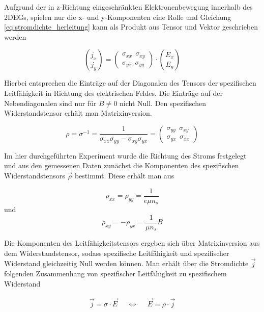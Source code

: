 Aufgrund der in z-Richtung eingeschränkten Elektronenbewegung innerhalb des 2DEGs, spielen nur die x- und y-Komponenten eine Rolle und Gleichung \ref{eq:stromdichte_herleitung} kann als Produkt aus Tensor und Vektor geschrieben werden

\begin{equation}
{j_x\choose j_y}=\begin{pmatrix}
\sigma_{xx} ~~ \sigma_{xy} \\ \sigma_{yx} ~~ \sigma_{yy}
\end{pmatrix} \cdot {E_x \choose E_y}
\label{eq:stromdichte_matrixdarst}
\end{equation}

Hierbei entsprechen die Einträge auf der Diagonalen des Tensors der spezifischen Leitfähigkeit in Richtung des elektrischen Feldes. Die Einträge auf der Nebendiagonalen sind nur für $B\neq0$ nicht Null.
Den spezifischen Widerstandstensor erhält man Matrixinversion.

\begin{equation}
\rho=\sigma^{-1}=\frac{1}{\sigma_{xx}\sigma_{yy} - \sigma_{xy}\sigma_{yx}}=\begin{pmatrix}
\sigma_{yy} ~~ \sigma_{xy} \\ \sigma_{yx} ~~ \sigma_{xx}
\end{pmatrix}
\label{eq:widerstandstensor_matrixinversion}
\end{equation}

Im hier durchgeführten Experiment wurde die Richtung des Stroms festgelegt und aus den gemessenen Daten zunächst die Komponenten des spezifischen Widerstandstensors $\vec{\rho}$ bestimmt. 
Diese erhält man aus

\begin{equation}
\rho_{xx}=\rho_{yy}=\frac{1}{e\mu n_s}
\label{eq:widerst_tensor_xx_yy}
\end{equation}
und
\begin{equation}
\rho_{xy}=-\rho_{yx}=\frac{1}{\mu n_s}B
\label{eq:widerst_tensor_xy_yx}
\end{equation}

Die Komponenten des Leitfähigkeitstensors ergeben sich über Matrixinversion aus dem Widerstandstensor, sodass spezifische Leitfähigkeit und spezifischer Widerstand gleichzeitig Null werden können. Man erhält über die Stromdichte $\vec{j}$ folgenden Zusammenhang von spezifischer Leitfähigkeit zu spezifischem Widerstand

\begin{align}
	\vec{j} = \sigma \cdot \vec{E} & & \Leftrightarrow & & \vec{E} = \rho \cdot \vec{j}
	\label{eq:e2rho}
\end{align}

